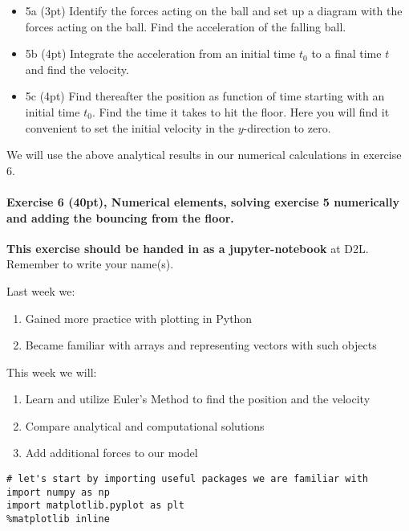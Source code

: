 \documentclass[%
oneside,                 %
final,                   %
10pt]{article}
\begin{document}
\begin{itemize}
\item 5a (3pt) Identify the forces acting on the ball and set up a diagram with the forces acting on the ball. Find the acceleration of the falling ball. 

\item 5b (4pt) Integrate the acceleration from an initial time $t_0$ to a final time $t$ and find the velocity.

\item 5c (4pt) Find thereafter the position as function of time starting with an initial time $t_0$. Find the time it takes to hit the floor.  Here you will find it convenient to set the initial velocity in the $y$-direction to zero.
\end{itemize}

\noindent
We will use the above analytical results in our numerical calculations in exercise 6.




\paragraph{Exercise 6 (40pt), Numerical elements, solving exercise 5 numerically and adding the bouncing from the floor.}
\textbf{This exercise should be handed in as a jupyter-notebook} at D2L. Remember to write your name(s). 

Last week we:
\begin{enumerate}
\item Gained more practice with plotting in Python

\item Became familiar with arrays and representing vectors with such objects
\end{enumerate}

\noindent
This week we will:
\begin{enumerate}
\item Learn and utilize Euler's Method to find the position and the velocity

\item Compare analytical and computational solutions 

\item Add additional forces to our model
\end{enumerate}

\noindent
\begin{verbatim}
# let's start by importing useful packages we are familiar with
import numpy as np
import matplotlib.pyplot as plt
%matplotlib inline
\end{verbatim}
\end{document}
